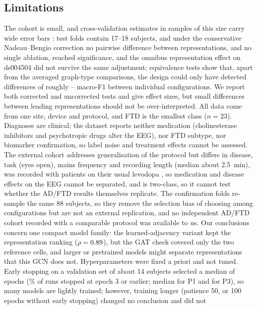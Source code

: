 \subsection{Limitations}\label{sec:limitations}
The cohort is small, and cross-validation estimates in samples of this size carry wide error bars
\cite{L6}: test folds contain 17--18 subjects, and under the conservative Nadeau--Bengio
correction no pairwise difference between representations, and no single ablation, reached
significance, and the omnibus representation effect on ds004504 did not survive the same adjustment;
equivalence tests show that, apart from the averaged graph-type comparisons, the design could only
have detected differences of roughly \eqAblMde{}--\eqGvcMde{} macro-F1 between individual configurations. We report both corrected and uncorrected tests and give effect sizes, but small
differences between leading representations should not be over-interpreted. All data come from one
site, device and protocol, and FTD is the smallest class ($n=23$). Diagnoses are clinical; the
dataset reports neither medication (cholinesterase inhibitors and psychotropic drugs alter the EEG), nor
FTD subtype, nor biomarker confirmation, so label noise and treatment effects cannot be assessed. The external cohort addresses
generalisation of the protocol but differs in disease, task (eyes open), mains frequency and recording
length (median about \SI{2.5}{\minute}), was recorded with patients on their usual levodopa
\cite{ds004584src}, so medication and disease effects on the EEG cannot be separated, and is two-class,
so it cannot test
whether the AD/FTD results themselves replicate. The confirmation folds re-sample the same 88 subjects, so they remove the
selection bias of choosing among configurations but are not an external replication, and no
independent AD/FTD cohort recorded with a comparable protocol was available to us. Our conclusions concern
one compact model family: the learned-adjacency variant kept the representation ranking
($\rho=0.89$), but the GAT check covered only the two reference cells, and larger or pretrained
models might separate representations that this GCN does not. Hyperparameters
were fixed a priori and not tuned. Early stopping on a validation set of about 14 subjects selected
a median of \bestEpochMedian{} epochs (\bestEpochLeThree{}\% of runs stopped at epoch 3 or earlier;
median \bestEpochPOne{} for P1 and \bestEpochPThree{} for P3), so many models are lightly trained; however,
training longer (patience 50, or 100 epochs without early stopping) changed no conclusion and did not
